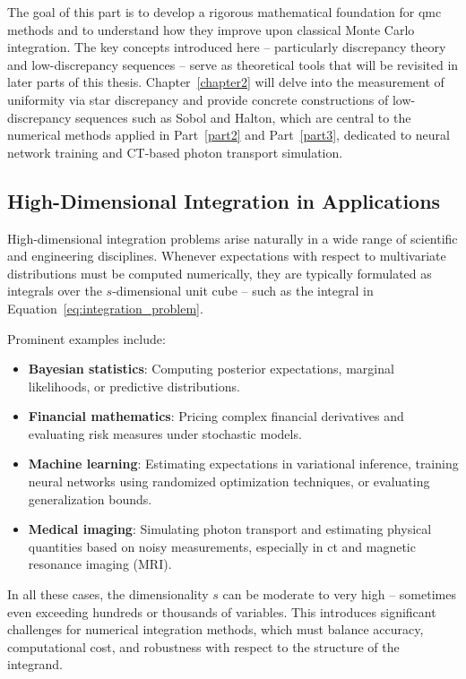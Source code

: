 The goal of this part is to develop a rigorous mathematical foundation for
\ac{qmc} methods and to understand how they improve upon classical Monte Carlo
integration. The key concepts introduced here -- particularly discrepancy theory
and low-discrepancy sequences -- serve as theoretical tools that will be
revisited in later parts of this thesis.
Chapter~\ref{chapter2} will delve into the
measurement of uniformity via star discrepancy and provide concrete
constructions of low-discrepancy sequences such as Sobol and Halton, which are
central to the numerical methods applied in Part~\ref{part2} and
Part~\ref{part3}, dedicated to neural network training and CT-based photon
transport simulation.


\subsection{High-Dimensional Integration in Applications}
High-dimensional integration problems arise naturally in a wide range of
scientific and engineering disciplines. Whenever expectations with respect to
multivariate distributions must be computed numerically, they are typically
formulated as integrals over the $s$-dimensional unit cube -- such as the
integral in Equation~\eqref{eq:integration_problem}.

Prominent examples include:
\begin{itemize}
    \item \textbf{Bayesian statistics}: Computing posterior expectations, marginal likelihoods, or predictive distributions.
    \item \textbf{Financial mathematics}: Pricing complex financial derivatives and evaluating risk measures under stochastic models.
    \item \textbf{Machine learning}: Estimating expectations in variational inference, training neural networks using randomized optimization techniques, or evaluating generalization bounds.
    \item \textbf{Medical imaging}: Simulating photon transport and estimating physical quantities based on noisy measurements, especially in \ac{ct} and magnetic resonance imaging (MRI).
\end{itemize}

In all these cases, the dimensionality $s$ can be moderate to very high --
sometimes even exceeding hundreds or thousands of variables. This introduces
significant challenges for numerical integration methods, which must balance
accuracy, computational cost, and robustness with respect to the structure of
the integrand.

